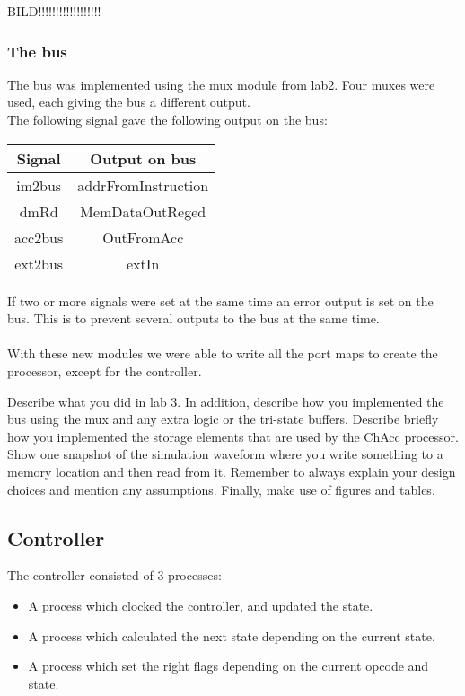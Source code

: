 \documentclass[a4paper]{article}
\begin{document}
			BILD!!!!!!!!!!!!!!!!!!

\subsubsection{The bus}

The bus was implemented using the mux module from lab2.
Four muxes were used, each giving the bus a different output.\\

The following signal gave the following output on the bus:\\
\begin{tabular} {|c|c|} \hline
Signal & Output on bus \\
\hline im2bus & addrFromInstruction\\
\hline dmRd & MemDataOutReged\\
\hline acc2bus & OutFromAcc\\
\hline ext2bus & extIn\\
\hline
\end{tabular}

If two or more signals were set at the same time an error output is set on the bus. This is to prevent several outputs to the bus at the same time.\\
\\
With these new modules we were able to write all the port maps to create the processor, except for the controller.




Describe what you did in lab 3. In addition, describe how you implemented
the bus using the mux and any extra logic or the tri-state buffers. Describe
briefly how you implemented the storage elements that are used by the
ChAcc processor. Show one snapshot of the simulation waveform where you
write something to a memory location and then read from it. Remember to
always explain your design choices and mention any assumptions. Finally,
make use of figures and tables.


\subsection{Controller}
The controller consisted of 3 processes:
\begin{itemize}
 \item A process which clocked the controller, and updated the state.
 \item A process which calculated the next state depending on the current state.
 \item A process which set the right flags depending on the current opcode and state.
\end{itemize}
\end{document}
